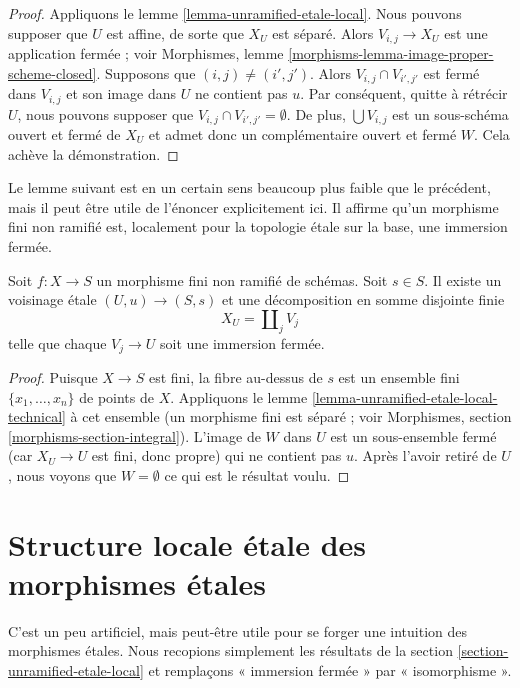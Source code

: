 \begin{proof}
Appliquons
le lemme \ref{lemma-unramified-etale-local}.
Nous pouvons supposer que $U$ est affine, de sorte que $X_U$ est séparé.
Alors $V_{i, j} \to X_U$ est une application fermée ; voir
Morphismes, lemme \ref{morphisms-lemma-image-proper-scheme-closed}.
Supposons que $(i, j) \not = (i', j')$.
Alors $V_{i, j} \cap V_{i', j'}$ est fermé dans $V_{i, j}$ et
son image dans $U$ ne contient pas $u$.
Par conséquent, quitte à rétrécir $U$, nous pouvons supposer que
$V_{i, j} \cap V_{i', j'} = \emptyset$. De plus, $\bigcup V_{i, j}$ est
un sous-schéma ouvert et fermé de $X_U$ et admet donc un
complémentaire ouvert et fermé $W$. Cela achève la démonstration.
\end{proof}

\noindent
Le lemme suivant est en un certain sens beaucoup plus faible que le précédent,
mais il peut être utile de l'énoncer explicitement ici. Il affirme qu'un morphisme fini
non ramifié est, localement pour la topologie \'etale sur la base, une immersion fermée.

\begin{lemma}
\label{lemma-finite-unramified-etale-local}
Soit $f : X \to S$ un morphisme fini non ramifié de schémas.
Soit $s \in S$.
Il existe un voisinage \'etale $(U, u) \to (S, s)$
et une décomposition en somme disjointe finie
$$
X_U = \coprod\nolimits_j V_j
$$
telle que chaque $V_j \to U$ soit une immersion fermée.
\end{lemma}

\begin{proof}
Puisque $X \to S$ est fini, la fibre au-dessus de $s$ est un ensemble fini
$\{x_1, \ldots, x_n\}$ de points de $X$. Appliquons le
lemme \ref{lemma-unramified-etale-local-technical}
à cet ensemble (un morphisme fini est séparé ; voir
Morphismes, section \ref{morphisms-section-integral}).
L'image de $W$ dans $U$ est un sous-ensemble fermé
(car $X_U \to U$ est fini, donc propre) qui ne
contient pas $u$. Après l'avoir retiré de $U$, nous voyons que $W = \emptyset$
ce qui est le résultat voulu.
\end{proof}




\section{Structure locale \'etale des morphismes \'etales}
\label{section-etale-local-etale}

\noindent
C'est un peu artificiel, mais peut-être utile pour se forger une intuition des morphismes \'etales.
Nous recopions simplement les résultats de la
section \ref{section-unramified-etale-local}
et remplaçons « immersion fermée » par « isomorphisme ».

